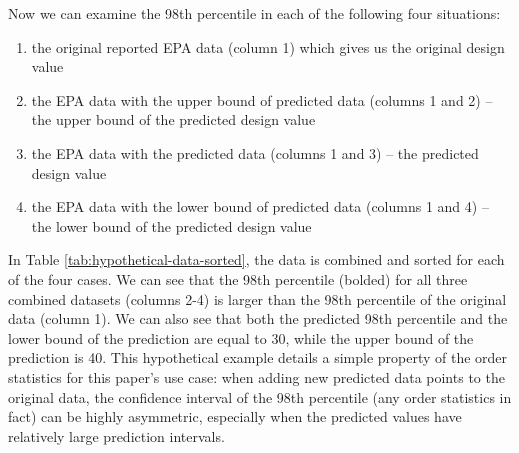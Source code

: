 \documentclass[12pt]{article}
\begin{document}
\FloatBarrier

Now we can examine the 98th percentile in each of the following four situations: 
\begin{enumerate}
    \item the original reported EPA data (column 1) which gives us the original design value
    \item the EPA data with the upper bound of predicted data (columns 1 and 2) -- the upper bound of the predicted design value
    \item the EPA data with the predicted data (columns 1 and 3) -- the predicted design value
    \item the EPA data with the lower bound of predicted data (columns 1 and 4) -- the lower bound of the predicted design value
\end{enumerate}

In Table \ref{tab:hypothetical-data-sorted}, the data is combined and sorted for each of the four cases. We can see that the 98th percentile (bolded) for all three combined datasets (columns 2-4) is larger than the 98th percentile of the original data (column 1). We can also see that both the predicted 98th percentile and the lower bound of the prediction are equal to 30, while the upper bound of the prediction is 40. This hypothetical example details a simple property of the order statistics for this paper's use case: when adding new predicted data points to the original data, the confidence interval of the 98th percentile (any order statistics in fact) can be highly asymmetric, especially when the predicted values have relatively large prediction intervals.
\end{document}
